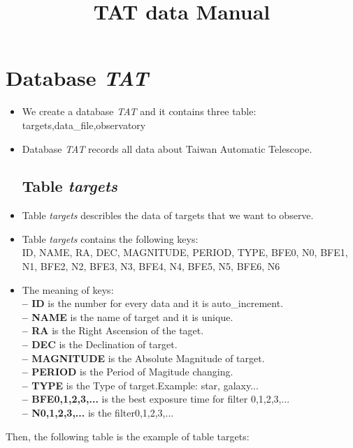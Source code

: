 \documentclass[12pt]{article}    %
\title{TAT data Manual}  %
\begin{document}
	\maketitle     %
	\newpage		 
	
	\tableofcontents	  %
	\newpage    
	
	
	\section{Database {\it TAT}}
	\begin{itemize}
		\item We create a database {\it TAT} and it contains three table:\\
		targets,data\_file,observatory
		\item Database {\it TAT} records all data about Taiwan Automatic Telescope. 
		
		\subsection{Table {\it targets}}
		\item Table {\it targets} describles the data of targets that we want to observe.
		\item Table {\it targets} contains the following keys:\\
		\footnotesize
		\indent ID, NAME, RA, DEC, MAGNITUDE, PERIOD, TYPE, BFE0, N0, BFE1, N1, BFE2, N2, BFE3, N3, BFE4, N4, BFE5, N5, BFE6, N6
		\normalsize
		\item The meaning of keys:\\[0.2cm]
		\textbf {-- ID} is the number for every data and it is auto\_increment.\\
		\textbf {-- NAME} is the name of target and it is unique.\\
		\textbf {-- RA} is the Right Ascension of the taget. \\
		\textbf {-- DEC} is the Declination of target.\\
		\textbf {-- MAGNITUDE} is the Absolute Magnitude of target.\\ 
		\textbf {-- PERIOD} is the Period of Magitude changing. \\
		\textbf {-- TYPE} is the Type of target.Example: star, galaxy...\\
		\textbf {-- BFE0,1,2,3,...} is the best exposure time for filter 0,1,2,3,...\\ 
		\textbf {-- N0,1,2,3,...} is the filter0,1,2,3,...
	\end{itemize}
	Then, the following table is the example of table targets:
	
\end{document}
